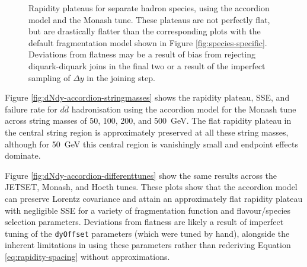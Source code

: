 \documentclass[12pt,a4paper]{report}
\begin{document}
\begin{figure}
  \centering
  \begin{minipage}[t]{0.48\linewidth}
    \centering
    
    \caption{The distributions of hadron multiplicity (number of primary hadrons) resulting from \qty{200}{\giga\electronvolt} $d\bar{d}$ hadronisation, compared between PYTHIA 8.315 defaults and the accordion model. The distributions match almost perfectly, demonstrating that the accordion model can be tuned with \texttt{stopMass} to align the multiplicity distributions.}
    \label{fig:multiplicity}
  \end{minipage}
  \hfill
  \begin{minipage}[t]{0.48\linewidth}
    \centering
    
    \caption{Rapidity plateaus for separate hadron species, using the accordion model and the Monash tune. These plateaus are not perfectly flat, but are drastically flatter than the corresponding plots with the default fragmentation model shown in Figure \ref{fig:species-specific}. Deviations from flatness may be a result of bias from rejecting diquark-diquark joins in the final two or a result of the imperfect sampling of $\Delta y$ in the joining step.}
    \label{fig:dNdy-accordion-species}
  \end{minipage}
\end{figure}

Figure \ref{fig:dNdy-accordion-stringmasses} shows the rapidity plateau, SSE, and failure rate for $d\bar{d}$ hadronisation using the accordion model for the Monash tune across string masses of 50, 100, 200, and \qty{500}{\giga\electronvolt}. The flat rapidity plateau in the central string region is approximately preserved at all these string masses, although for \qty{50}{\giga\electronvolt} this central region is vanishingly small and endpoint effects dominate.

Figure \ref{fig:dNdy-accordion-differenttunes} show the same results across the JETSET, Monash, and Hoeth tunes. These plots show that the accordion model can preserve Lorentz covariance and attain an approximately flat rapidity plateau with negligible SSE for a variety of fragmentation function and flavour/species selection parameters. Deviations from flatness are likely a result of imperfect tuning of the \texttt{dyOffset} parameters (which were tuned by hand), alongside the inherent limitations in using these parameters rather than rederiving Equation \eqref{eq:rapidity-spacing} without approximations.
\end{document}
